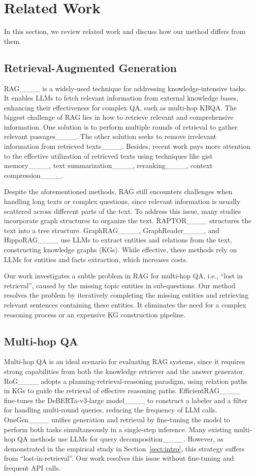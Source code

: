 \section{Related Work}
In this section, we review related work and discuss how our method differs from them.

\subsection{Retrieval-Augmented Generation}
RAG____ is a widely-used technique for addressing knowledge-intensive tasks. 
It enables LLMs to fetch relevant information from external knowledge bases, enhancing their effectiveness for complex QA, such as multi-hop KBQA.
The biggest challenge of RAG lies in how to retrieve relevant and comprehensive information.
One solution is to perform multiple rounds of retrieval to gather relevant passages____.
The other solution seeks to remove irrelevant information from retrieved texts____. 
Besides, recent work pays more attention to the effective utilization of retrieved texts using techniques like
gist memory____,
text summarization____, 
reranking____, 
context compression____.

Despite the aforementioned methods, RAG still encounters challenges when handling long texts or complex questions, since relevant information is usually scattered across different parts of the text.
To address this issue, many studies incorporate graph structures to organize the text. 
RAPTOR____ structures the text into a tree structure.
GraphRAG____, GraphReader____, and HippoRAG____ use LLMs to extract entities and relations from the text, constructing knowledge graphs (KGs). 
While effective, these methods rely on LLMs for entities and facts extraction, which increases costs.

Our work investigates a subtle problem in RAG for multi-hop QA, i.e., ``lost in retrieval'', caused by the missing topic entities in sub-questions.
Our method resolves the problem by iteratively completing the missing entities and retrieving relevant sentences containing these entities.
It eliminates the need for a complex reasoning process or an expensive KG construction pipeline.

\subsection{Multi-hop QA}
Multi-hop QA is an ideal scenario for evaluating RAG systems, since it requires strong capabilities from both the knowledge retriever and the answer generator. 
RoG____ adopts a planning-retrieval-reasoning paradigm, using relation paths in KGs to guide the retrieval of effective reasoning paths.
EfficientRAG____ fine-tunes the DeBERTa-v3-large model____ to construct a labeler and a filter for handling multi-round queries, reducing the frequency of LLM calls.
OneGen____ unifies generation and retrieval by fine-tuning the model to perform both tasks simultaneously in a single-step inference. 
Many existing multi-hop QA methods use LLMs for query decomposition____. 
However, as demonstrated in the empirical study in Section~\ref{sect:intro}, this strategy suffers from ``lost-in-retrieval''.
Our work resolves this issue without fine-tuning and frequent API calls.

